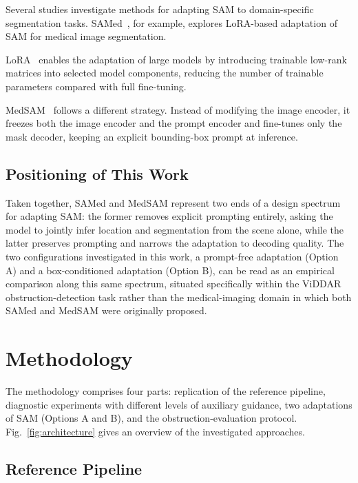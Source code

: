 \documentclass[conference]{IEEEtran}
\begin{document}
Several studies investigate methods for adapting SAM to domain-specific segmentation tasks. SAMed~\cite{samed}, for example, explores LoRA-based adaptation of SAM for medical image segmentation.

LoRA~\cite{lora} enables the adaptation of large models by introducing trainable low-rank matrices into selected model components, reducing the number of trainable parameters compared with full fine-tuning.

MedSAM~\cite{medsam} follows a different strategy. Instead of modifying the image encoder, it freezes both the image encoder and the prompt encoder and fine-tunes only the mask decoder, keeping an explicit bounding-box prompt at inference.

\subsection{Positioning of This Work}

Taken together, SAMed and MedSAM represent two ends of a design spectrum for adapting SAM: the former removes explicit prompting entirely, asking the model to jointly infer location and segmentation from the scene alone, while the latter preserves prompting and narrows the adaptation to decoding quality. The two configurations investigated in this work, a prompt-free adaptation (Option A) and a box-conditioned adaptation (Option B), can be read as an empirical comparison along this same spectrum, situated specifically within the ViDDAR obstruction-detection task rather than the medical-imaging domain in which both SAMed and MedSAM were originally proposed.




\section{Methodology}

The methodology comprises four parts: replication of the reference pipeline, diagnostic experiments with different levels of auxiliary guidance, two adaptations of SAM (Options A and B), and the obstruction-evaluation protocol. Fig.~\ref{fig:architecture} gives an overview of the investigated approaches.

\subsection{Reference Pipeline}\label{sec:ref}
\end{document}
